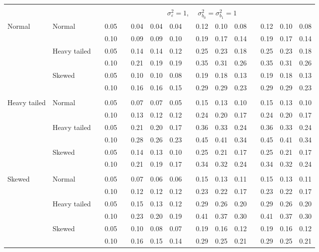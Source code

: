\documentclass{article} %
\begin{document}
\begin{table}[ht]
\begin{scriptsize}
\begin{center}
\begin{tabular}{ll p{.1cm} c p{.1cm} rrr p{.1cm} rrr p{.1cm} rrr}
&&&&&&&&&&&&&&&\\
& && && \multicolumn{9}{c}{$\sigma_{\varepsilon}^2 = 1$, \ \ $\sigma_{b_0}^2 = \sigma_{b_1}^2 = 1$} \\ \cline{6-16}
Normal       & Normal       && 0.05 &&  0.04 & 0.04 & 0.04 && 0.12 & 0.10 & 0.08 && 0.12 & 0.10 & 0.08 \\ 
             &              && 0.10 &&  0.09 & 0.09 & 0.10 && 0.19 & 0.17 & 0.14 && 0.19 & 0.17 & 0.14 \\ 
             & Heavy tailed && 0.05 &&  0.14 & 0.14 & 0.12 && 0.25 & 0.23 & 0.18 && 0.25 & 0.23 & 0.18 \\ 
             &              && 0.10 &&  0.21 & 0.19 & 0.19 && 0.35 & 0.31 & 0.26 && 0.35 & 0.31 & 0.26 \\ 
             & Skewed       && 0.05 &&  0.10 & 0.10 & 0.08 && 0.19 & 0.18 & 0.13 && 0.19 & 0.18 & 0.13 \\ 
             &              && 0.10 &&  0.16 & 0.16 & 0.15 && 0.29 & 0.29 & 0.23 && 0.29 & 0.29 & 0.23 \\ 
             &&&&&&&&&&&&&&&\\
Heavy tailed & Normal       && 0.05 &&  0.07 & 0.07 & 0.05 && 0.15 & 0.13 & 0.10 && 0.15 & 0.13 & 0.10 \\ 
             &              && 0.10 &&  0.13 & 0.12 & 0.12 && 0.24 & 0.20 & 0.17 && 0.24 & 0.20 & 0.17 \\ 
             & Heavy tailed && 0.05 &&  0.21 & 0.20 & 0.17 && 0.36 & 0.33 & 0.24 && 0.36 & 0.33 & 0.24 \\ 
             &              && 0.10 &&  0.28 & 0.26 & 0.23 && 0.45 & 0.41 & 0.34 && 0.45 & 0.41 & 0.34 \\ 
             & Skewed       && 0.05 &&  0.14 & 0.13 & 0.10 && 0.25 & 0.21 & 0.17 && 0.25 & 0.21 & 0.17 \\ 
             &              && 0.10 &&  0.21 & 0.19 & 0.17 && 0.34 & 0.32 & 0.24 && 0.34 & 0.32 & 0.24 \\ 
             &&&&&&&&&&&&&&&\\
Skewed       & Normal       && 0.05 &&  0.07 & 0.06 & 0.06 && 0.15 & 0.13 & 0.11 && 0.15 & 0.13 & 0.11 \\ 
             &              && 0.10 &&  0.12 & 0.12 & 0.12 && 0.23 & 0.22 & 0.17 && 0.23 & 0.22 & 0.17 \\ 
             & Heavy tailed && 0.05 &&  0.15 & 0.13 & 0.12 && 0.29 & 0.26 & 0.20 && 0.29 & 0.26 & 0.20 \\ 
             &              && 0.10 &&  0.23 & 0.20 & 0.19 && 0.41 & 0.37 & 0.30 && 0.41 & 0.37 & 0.30 \\ 
             & Skewed       && 0.05 &&  0.10 & 0.08 & 0.07 && 0.19 & 0.16 & 0.12 && 0.19 & 0.16 & 0.12 \\ 
             &              && 0.10 &&  0.16 & 0.15 & 0.14 && 0.29 & 0.25 & 0.21 && 0.29 & 0.25 & 0.21 \\ 



\end{tabular}
\end{center}
\end{scriptsize}
\end{table}
\end{document}
